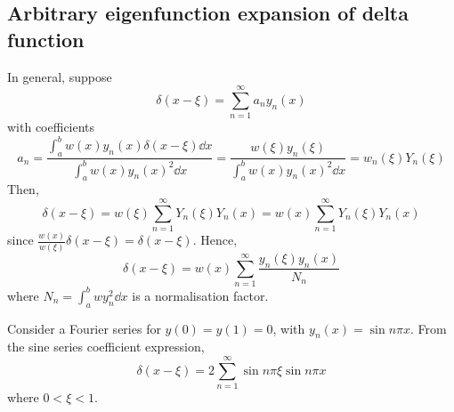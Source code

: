 \subsection{Arbitrary eigenfunction expansion of delta function}
In general, suppose
\[
	\delta(x-\xi) = \sum_{n=1}^\infty a_n y_n(x)
\]
with coefficients
\[
	a_n = \frac{\int_a^b w(x) y_n(x) \delta(x-\xi) \dd{x}}{\int_a^b w(x) y_n(x)^2 \dd{x}} = \frac{w(\xi) y_n(\xi)}{\int_a^b w(x) y_n(x)^2 \dd{x}} = w_n(\xi) Y_n(\xi)
\]
Then,
\[
	\delta(x-\xi) = w(\xi) \sum_{n=1}^\infty Y_n(\xi) Y_n(x) = w(x) \sum_{n=1}^\infty Y_n(\xi) Y_n(x)
\]
since \( \frac{w(x)}{w(\xi)} \delta(x - \xi) = \delta(x - \xi) \).
Hence,
\[
	\delta(x-\xi) = w(x) \sum_{n=1}^\infty \frac{y_n(\xi) y_n(x)}{N_n}
\]
where \( N_n = \int_a^b w y_n^2 \dd{x} \) is a normalisation factor.
\begin{example}
	Consider a Fourier series for \( y(0) = y(1) = 0 \), with \( y_n(x) = \sin n \pi x \).
	From the sine series coefficient expression,
	\[
		\delta(x-\xi) = 2\sum_{n=1}^\infty \sin n \pi \xi \sin n \pi x
	\]
	where \( 0 < \xi < 1 \).
\end{example}

